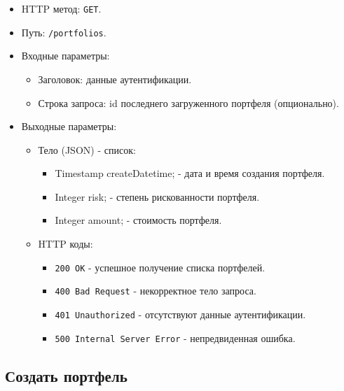 \documentclass[a4paper, 14pt]{article}
\begin{document}
\begin{itemize}
    \item HTTP метод: \texttt{GET}.
    \item Путь: \texttt{/portfolios}.
    \item Входные параметры:
    \begin{itemize}
        \item Заголовок: данные аутентификации.
        \item Строка запроса: id последнего загруженного портфеля (опционально).
    \end{itemize}
    \item Выходные параметры:
    \begin{itemize}
        \item Тело (JSON) - список:
        \begin{itemize}
            \item Timestamp createDatetime; - дата и время создания портфеля.
            \item Integer risk; - степень рискованности портфеля.
            \item Integer amount; - стоимость портфеля.
        \end{itemize}
        \item HTTP коды:
        \begin{itemize}
            \item \texttt{200 OK} - успешное получение списка портфелей.
            \item \texttt{400 Bad Request} - некорректное тело запроса.
            \item \texttt{401 Unauthorized} - отсутствуют данные аутентификации.
            \item \texttt{500 Internal Server Error} - непредвиденная ошибка.
        \end{itemize}
    \end{itemize}
\end{itemize}

\subsection{Создать портфель}
\end{document}
